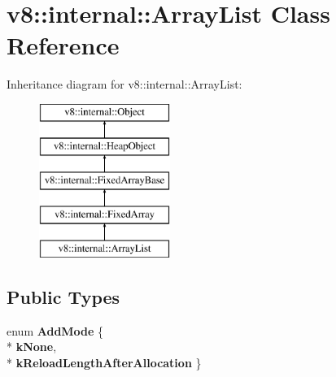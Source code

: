 \hypertarget{classv8_1_1internal_1_1_array_list}{}\section{v8\+:\+:internal\+:\+:Array\+List Class Reference}
\label{classv8_1_1internal_1_1_array_list}
Inheritance diagram for v8\+:\+:internal\+:\+:Array\+List\+:\begin{figure}[H]
\begin{center}
\leavevmode
\includegraphics[height=5.000000cm]{classv8_1_1internal_1_1_array_list}
\end{center}
\end{figure}
\subsection*{Public Types}
\begin{DoxyCompactItemize}
\item 
enum {\bfseries Add\+Mode} \{ \\*
{\bfseries k\+None}, 
\\*
{\bfseries k\+Reload\+Length\+After\+Allocation}
 \}\hypertarget{classv8_1_1internal_1_1_array_list_a2e15c88724a58d1b3f3754d5e5db4928}{}\label{classv8_1_1internal_1_1_array_list_a2e15c88724a58d1b3f3754d5e5db4928}

\end{DoxyCompactItemize}
